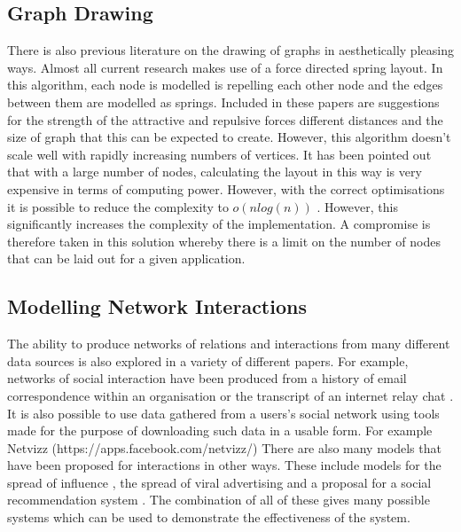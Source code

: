 \documentclass[12pt,a4paper]{article}
\begin{document}
\subsection{Graph Drawing}
There is also previous literature on the drawing of graphs in aesthetically pleasing ways. Almost all current research makes use of a force directed spring layout. In this algorithm, each node is modelled is repelling each other node and the edges between them are modelled as springs\cite{fruchterman1991graph}. Included in these papers are suggestions for the strength of the attractive and repulsive forces different distances and the size of graph that this can be expected to create. However, this algorithm doesn't scale well with rapidly increasing numbers of vertices. It has been pointed out that with a large number of nodes, calculating the layout in this way is very expensive in terms of computing power. However, with the correct optimisations it is possible to reduce the complexity to $o(nlog(n))$ \cite{barnes1986hierarchical}. However, this significantly increases the complexity of the implementation. A compromise is therefore taken in this solution whereby there is a limit on the number of nodes that can be laid out for a given application.

\subsection{Modelling Network Interactions}
The ability to produce networks of relations and interactions from many different data sources is also explored in a variety of different papers. For example, networks of social interaction have been produced from a history of email correspondence within an organisation \cite{fisher2004social} or the transcript of an internet relay chat \cite{mutton2004inferring}. It is also possible to use data gathered from a users's social network using tools made for the purpose of downloading such data in a usable form. For example Netvizz (https://apps.facebook.com/netvizz/)
There are also many models that have been proposed for interactions in other ways. These include models for the spread of influence \cite{kempe2003maximizing}, the spread of viral advertising \cite{van2010viral} and a proposal for a social recommendation system \cite{walter2008model}. The combination of all of these gives many possible systems which can be used to demonstrate the effectiveness of the system.
\end{document}
